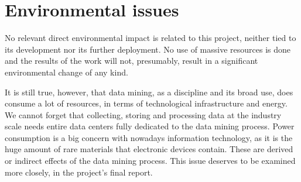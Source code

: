 \section{Environmental issues}
\label{Practical::Environmental}

No relevant direct environmental impact is related to this project, neither tied to its
development nor its further deployment. No use of massive resources is done and the
results of the work will not, presumably, result in a significant environmental change of
any kind.

It is still true, however, that data mining, as a discipline and its broad use, does
consume a lot of resources, in terms of technological infrastructure and energy. We cannot
forget that collecting, storing and processing data at the industry scale needs entire data
centers fully dedicated to the data mining process. Power consumption is a big concern
with nowadays information technology, as it is the huge amount of rare materials that
electronic devices contain. These are derived or indirect effects of the data mining process.
This issue deserves to be examined more closely, in the project’s final report.
